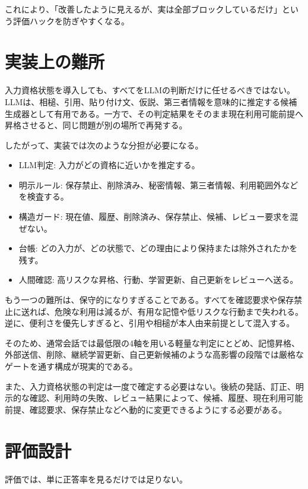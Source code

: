 \documentclass[12pt,a4paper]{article}
\begin{document}
これにより、「改善したように見えるが、実は全部ブロックしているだけ」という評価ハックを防ぎやすくなる。

\section{実装上の難所}\label{ux5b9fux88c5ux4e0aux306eux96e3ux6240}

入力資格状態を導入しても、すべてをLLMの判断だけに任せるべきではない。LLMは、相槌、引用、貼り付け文、仮説、第三者情報を意味的に推定する候補生成器として有用である。一方で、その判定結果をそのまま現在利用可能前提へ昇格させると、同じ問題が別の場所で再発する。

したがって、実装では次のような分担が必要になる。

\begin{itemize}
\tightlist
\item
  LLM判定: 入力がどの資格に近いかを推定する。
\item
  明示ルール: 保存禁止、削除済み、秘密情報、第三者情報、利用範囲外などを検査する。
\item
  構造ガード: 現在値、履歴、削除済み、保存禁止、候補、レビュー要求を混ぜない。
\item
  台帳: どの入力が、どの状態で、どの理由により保持または除外されたかを残す。
\item
  人間確認: 高リスクな昇格、行動、学習更新、自己更新をレビューへ送る。
\end{itemize}

もう一つの難所は、保守的になりすぎることである。すべてを確認要求や保存禁止に送れば、危険な利用は減るが、有用な記憶や低リスクな行動まで失われる。逆に、便利さを優先しすぎると、引用や相槌が本人由来前提として混入する。

そのため、通常会話では最低限の4軸を用いる軽量な判定にとどめ、記憶昇格、外部送信、削除、継続学習更新、自己更新候補のような高影響の段階では厳格なゲートを通す構成が現実的である。

また、入力資格状態の判定は一度で確定する必要はない。後続の発話、訂正、明示的な確認、利用時の失敗、レビュー結果によって、候補、履歴、現在利用可能前提、確認要求、保存禁止などへ動的に変更できるようにする必要がある。

\section{評価設計}\label{ux8a55ux4fa1ux8a2dux8a08}

評価では、単に正答率を見るだけでは足りない。
\end{document}
